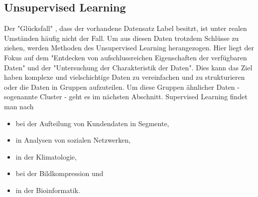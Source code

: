 \subsection{Unsupervised Learning}
Der "Glücksfall" , dass der vorhandene Datensatz Label besitzt, ist unter realen Umständen häufig nicht der Fall. Um aus diesen Daten trotzdem Schlüsse zu ziehen, werden Methoden des Unsupervised Learning herangezogen. Hier liegt der Fokus auf dem "Entdecken von aufschlussreichen Eigenschaften der verfügbaren Daten"\citep[S.277; eigene Übersetzung]{kubat_introduction_2017} und der "Untersuchung der Charakteristik der Daten"\citep[S.~13; eigene Übersetzung]{kim_matlab_2017}. Dies kann das Ziel haben komplexe und vielschichtige Daten zu vereinfachen und zu strukturieren\citep{ericson_how_2017} oder die Daten in Gruppen aufzuteilen\citep[S.~22]{lison_introduction_2012}. Um diese Gruppen ähnlicher Daten - sogenannte Cluster - geht es im nächsten Abschnitt.\newline
Supervised Learning findet man nach \citep[S.~223]{ramasubramanian_machine_2017}
\begin{itemize}
\item bei der Aufteilung von Kundendaten in Segmente,
\item in Analysen von sozialen Netzwerken,
\item in der Klimatologie,
\item bei der Bildkompression und
\item in der Bioinformatik.\citep[S.~6]{kauchak_zoterovoll2.pdf_2016}
\end{itemize}

